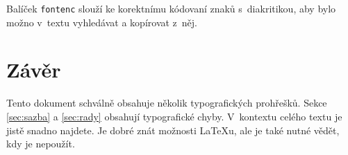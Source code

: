 \documentclass[a4paper, twocolumn, 10pt]{article}
\begin{document}
Balíček {\texttt{fontenc}} slouží ke korektnímu kódovaní znaků s~diakritikou, aby bylo možno v~textu vyhledávat a kopírovat z~něj.

\section{Závěr}
Tento dokument schválně obsahuje několik typografických prohřešků.
Sekce \ref{sec:sazba} a \ref{sec:rady} obsahují typografické chyby.
V~kontextu celého textu je jistě snadno najdete.
Je dobré znát možnosti \LaTeX u, ale je také nutné vědět, kdy je nepoužít.
\end{document}
